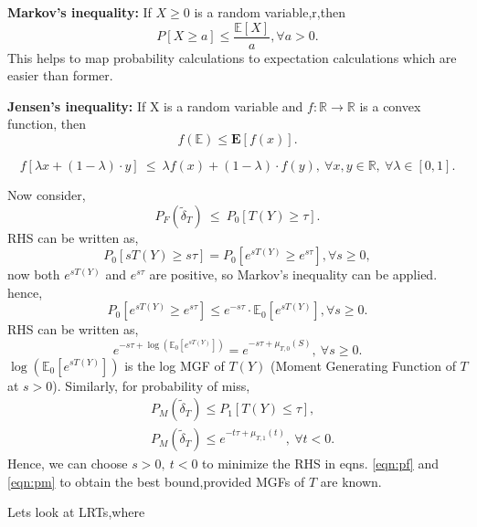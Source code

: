 \documentclass[a4paper,english,12pt]{article}
\begin{document}
\par \textbf{Markov's inequality:} If $X \geq 0$ is a random variable,r,then
\begin{equation}
P[X\geq a]\leq \frac{\mathbb{E}[X]}{a},\forall a>0.
\end{equation}
This helps to map probability calculations to expectation calculations which are easier than former.
\par \textbf{Jensen's inequality:} If X is a random variable and $f:\mathbb{R}\rightarrow \mathbb{R}$ is a convex function, then
\begin{equation}
f(\mathbb{E})\leq \mathbf{E}[f(x)].
\end{equation}
\begin{defn}
\begin{equation}
f[\lambda x+(1-\lambda)\cdot y]\ \leq\ \lambda f(x)+(1-\lambda)\cdot f(y),\ \forall x,y\in\mathbb{R},\ \forall \lambda \in [0,1].
\end{equation}
\end{defn}
Now consider,
\begin{equation}
P_F(\tilde\delta_T)\ \leq\ P_0[T(Y)\geq\tau].
\end{equation}
RHS can be written as,
\begin{equation}
P_0[s T(Y)\geq s\tau]=P_0[e^{s T(Y)}\geq e^{s\tau}],\forall s\geq 0,
\end{equation}
now both $e^{s T(Y)}$ and $e^{s\tau}$ are positive, so Markov's inequality can be applied.
hence,
\begin{equation}\label{eqn:pf}
P_0[e^{s T(Y)}\geq e^{s\tau}] \leq e^{-s\tau}\cdot\mathbb{E}_0[e^{s T(Y)}],\forall s\geq 0.
\end{equation}
RHS can be written as,
\begin{equation}
e^{-s\tau+\log(\mathbb{E}_0[e^{s T(Y)}])}
= e^{-s\tau+\mu_{T,0}(S)},~\forall s\geq 0.
\end{equation}
$\log(\mathbb{E}_0[e^{s T(Y)}])$ is the log MGF of $T(Y)$ (Moment Generating Function of $T$ at $s>0$). Similarly, for probability of miss,
\begin{align}\label{eqn:pm}
&P_M(\tilde\delta_T)\leq P_1[T(Y)\leq\tau],\\\nonumber
&P_M(\tilde\delta_T)\leq e^{-t\tau +\mu_{T,1}(t)},~\forall t<0.
\end{align}
Hence, we can choose $s>0,~t<0$ to minimize the RHS in eqns. \eqref{eqn:pf} and \eqref{eqn:pm} to obtain the best bound,provided MGFs of $T$ are known.
\par Lets look at LRTs,where
\end{document}
